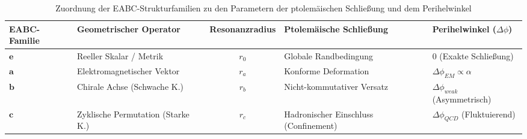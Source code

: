 \begin{table}[htbp]
\centering
\caption{Zuordnung der EABC-Strukturfamilien zu den Parametern der ptolemäischen Schließung und dem Perihelwinkel}
\label{tab:eabc_ptolemaeisch_perihel}
\small
\begin{tabular}{llcll}
\toprule
\textbf{EABC-Familie} & \textbf{Geometrischer Operator} & \textbf{Resonanzradius} & \textbf{Ptolemäische Schließung} & \textbf{Perihelwinkel ($\Delta \phi$)} \\
\midrule
$\mathbf{e}$ & Reeller Skalar / Metrik & $r_0$ & Globale Randbedingung & $0$ (Exakte Schließung) \\
$\mathbf{a}$ & Elektromagnetischer Vektor & $r_a$ & Konforme Deformation & $\Delta \phi_{EM} \propto \alpha$ \\
$\mathbf{b}$ & Chirale Achse (Schwache K.) & $r_b$ & Nicht-kommutativer Versatz & $\Delta \phi_{weak}$ (Asymmetrisch) \\
$\mathbf{c}$ & Zyklische Permutation (Starke K.) & $r_c$ & Hadronischer Einschluss (Confinement) & $\Delta \phi_{QCD}$ (Fluktuierend) \\
\bottomrule
\end{tabular}
\end{table}